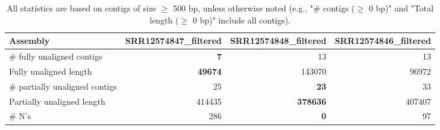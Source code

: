 \documentclass[12pt,a4paper]{article}
\begin{document}
\begin{table}[ht]
\begin{center}
\caption{All statistics are based on contigs of size $\geq$ 500 bp, unless otherwise noted (e.g., "\# contigs ($\geq$ 0 bp)" and "Total length ($\geq$ 0 bp)" include all contigs).}
\begin{tabular}{|l*{3}{|r}|}
\hline
Assembly & SRR12574847\_filtered & SRR12574848\_filtered & SRR12574846\_filtered \\ \hline
\# fully unaligned contigs & {\bf 7} & 13 & 13 \\ \hline
Fully unaligned length & {\bf 49674} & 143070 & 96972 \\ \hline
\# partially unaligned contigs & 25 & {\bf 23} & 33 \\ \hline
Partially unaligned length & 414435 & {\bf 378636} & 407407 \\ \hline
\# N's & 286 & {\bf 0} & 97 \\ \hline
\end{tabular}
\end{center}
\end{table}
\end{document}
